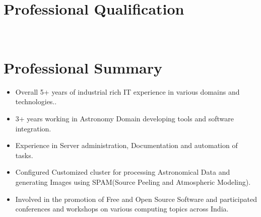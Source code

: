 \documentclass[11pt,a4paper,sans]{moderncv}        %
\begin{document}
\makecvtitle
\section{Professional Qualification}
~\\
\section{Professional Summary}
\begin{itemize} 
\item Overall 5+ years of industrial rich IT experience in various domains and technologies..
\item 3+ years working in Astronomy Domain developing tools and software integration.
\item Experience in Server administration, Documentation and automation of tasks.
\item Configured Customized cluster for processing Astronomical Data and generating Images using SPAM(Source Peeling and Atmospheric Modeling).
\item Involved in the promotion of Free and Open Source Software and participated conferences and workshops on various computing topics across India.
\end{itemize}
~\\
\end{document}
